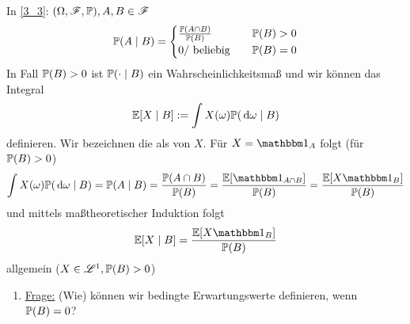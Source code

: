 ﻿In \cref{3_3}: $(\O, \F, \P), A,B \in \F$ %
\begin{align*}
	\P(A \mid B) = \begin{cases}
	\frac{\P(A \cap B)}{\P(B)} &\quad \P(B) > 0\\
	0/ \text{ beliebig} &\quad \P(B) = 0
	\end{cases}
\end{align*}
In Fall $\P(B) > 0$ ist $\P(\cdot\mid B)$ ein Wahrscheinlichkeitsmaß und wir können das Integral 
\[
	\E[X \mid B] := \int X(\omega) \P(\d \omega \mid B)
\]
definieren. Wir bezeichnen die als  von $X$. Für $X= \indi_{A}$ folgt (für $\P(B) > 0$)
\[
	\int X(\omega) \P(\d \omega \mid B) = \P (A \mid B) = \frac{\P(A \cap B)}{\P(B)} = \frac{\E[\indi_{A\cap B}]}{\P(B)} = \frac{\E[X \indi_{B}]}{\P(B)}
\]
und mittels maßtheoretischer Induktion folgt
\begin{align*}
	\E[X \mid B] = \frac{\E[X \indi_B]}{\P(B)}
\end{align*}
allgemein ($X \in \Ln{1}, \P(B) > 0$)
\begin{enumerate}[label=]
	\item \ul{Frage:} (Wie) können wir bedingte Erwartungswerte definieren, wenn $\P(B) = 0$?
\end{enumerate}
